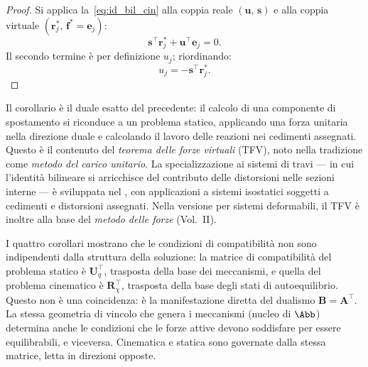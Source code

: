 \begin{proof}
	Si applica la~\eqref{eq:id_bil_cin} alla coppia reale
	$(\bm{u},\,\bm{s})$ e alla coppia virtuale
	$(\bm{r}^*_j,\,\bm{f}^* = \bm{e}_j)$:
	\begin{equation}
		\bm{s}^{\top}\bm{r}^*_j +
		\bm{u}^{\top}\bm{e}_j = 0.
	\end{equation}
	Il secondo termine è per definizione $u_j$;
	riordinando:
	\begin{equation}
		u_j = -\bm{s}^{\top}\bm{r}^*_j. 
	\end{equation}
\end{proof}

\begin{oss}
	Il corollario è il duale esatto del precedente:
	il calcolo di una componente di spostamento si
	riconduce a un problema statico, applicando una
	forza unitaria nella direzione duale e calcolando
	il lavoro delle reazioni nei cedimenti assegnati.
	Questo è il contenuto del \emph{teorema delle forze
		virtuali} (TFV), noto nella tradizione come
	\emph{metodo del carico unitario}. La specializzazione
	ai sistemi di travi --- in cui l'identità bilineare si
	arricchisce del contributo delle distorsioni nelle
	sezioni interne --- è sviluppata nel
	, con applicazioni a sistemi
	isostatici soggetti a cedimenti e distorsioni
	assegnati. Nella versione per sistemi deformabili,
	il TFV è inoltre alla base del \emph{metodo delle
		forze} (Vol.~II).
\end{oss}


\begin{oss}
	I quattro corollari mostrano che le condizioni di
	compatibilità non sono indipendenti dalla struttura
	della soluzione: la matrice di compatibilità del
	problema statico è $\bm{U}_q^{\top}$, trasposta
	della base dei meccanismi, e quella del problema
	cinematico è $\bm{R}_\chi^{\top}$, trasposta della
	base degli stati di autoequilibrio. Questo non è una
	coincidenza: è la manifestazione diretta del dualismo
	$\bm{B} = \bm{A}^{\top}$. La stessa geometria di
	vincolo che genera i meccanismi (nucleo di $\Abb$)
	determina anche le condizioni che le forze attive
	devono soddisfare per essere equilibrabili, e
	viceversa. Cinematica e statica sono governate dalla
	stessa matrice, letta in direzioni opposte.
\end{oss}



